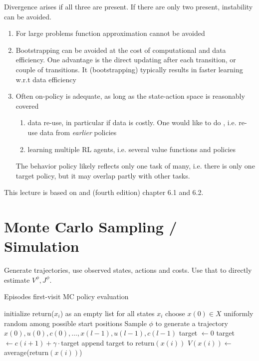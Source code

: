Divergence arises if all three are present. 
If there are only two present, instability can be avoided.
\begin{enumerate}
    \item For large problems function approximation cannot be avoided
    \item Bootstrapping can be avoided at the cost of computational and data efficiency. One advantage is the direct updating after each transition, or couple of transitions. It (bootstrapping) typically results in faster learning w.r.t data efficiency 
    \item Often on-policy is adequate, as long as the state-action space is reasonably covered \begin{enumerate}
        \item data re-use, in particular if data is costly. One would like to do , i.e. re-use data from \textit{earlier} policies
        \item learning multiple RL agents, i.e. several value functions and policies 
    \end{enumerate} 
              The behavior policy likely reflects only one task of many, i.e. there is only one target policy, but it may overlap partly with other tasks.
\end{enumerate}

This lecture is based on \cite{Bohn.Garcke.Griebel:2024} and \cite{Bertsekas2000} (fourth edition) chapter 6.1 and 6.2. 

\section{Monte Carlo Sampling / Simulation}

 Generate trajectories, use observed states,
actions and costs. Use that to directly estimate \(V^\phi, J^\phi\).


\begin{algorithm}[H]
    \caption{Episodes first-visit  MC policy evaluation}\label{alg:fvmcpe}
    \begin{algorithmic}
    \State initialize return(\(x_i\)) as an empty list for all states \(x_i\)
        \State choose \(x(0)\in X\) uniformly random among possible start positions
        \State Sample \(\phi\) to generate a trajectory \(x(0),u(0),c(0),\dots, x(l-1),u(l-1),c(l-1)\)
        \State target \(\leftarrow 0\)
            \State target \(\leftarrow c(i+1)+\gamma\cdot\)target 
                \State append target to return\((x(i))\)
                \State \(V(x(i))\leftarrow \) average(return\((x(i))\))
            \EndIf
        \EndFor
    \EndWhile
\end{algorithmic}
\end{algorithm}

